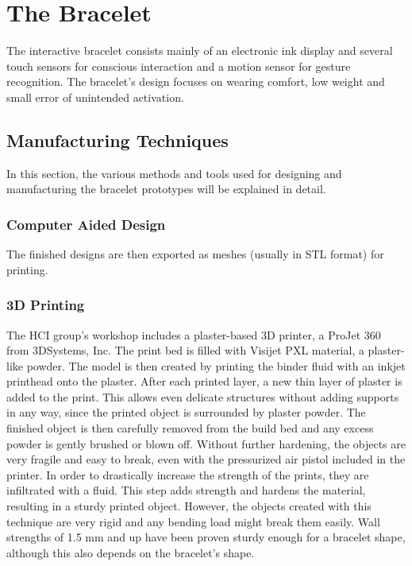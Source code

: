 \chapter{The Bracelet}

The interactive bracelet consists mainly of an electronic ink display and several touch sensors for conscious interaction and a motion sensor for gesture recognition. The bracelet's design focuses on wearing comfort, low weight and small error of unintended activation.

\section{Manufacturing Techniques}

In this section, the various methods and tools used for designing and manufacturing the bracelet prototypes will be explained in detail.

\subsection{Computer Aided Design}
The finished designs are then exported as meshes (usually in \ac{STL} format) for printing.

\subsection{3D Printing}
The \ac{HCI} group's workshop includes a plaster-based 3D printer, a ProJet 360 from 3DSystems, Inc. The print bed is filled with Visijet PXL material, a plaster-like powder. The model is then created by printing the binder fluid with an inkjet printhead onto the plaster. After each printed layer, a new thin layer of plaster is added to the print. This allows even delicate structures without adding supports in any way, since the printed object is surrounded by plaster powder. The finished object is then carefully removed from the build bed and any excess powder is gently brushed or blown off. Without further hardening, the objects are very fragile and easy to break, even with the pressurized air pistol included in the printer. In order to drastically increase the strength of the prints, they are infiltrated with a fluid. This step adds strength and hardens the material, resulting in a sturdy printed object. However, the objects created with this technique are very rigid and any bending load might break them easily. Wall strengths of 1.5 mm and up have been proven sturdy enough for a bracelet shape, although this also depends on the bracelet's shape.

